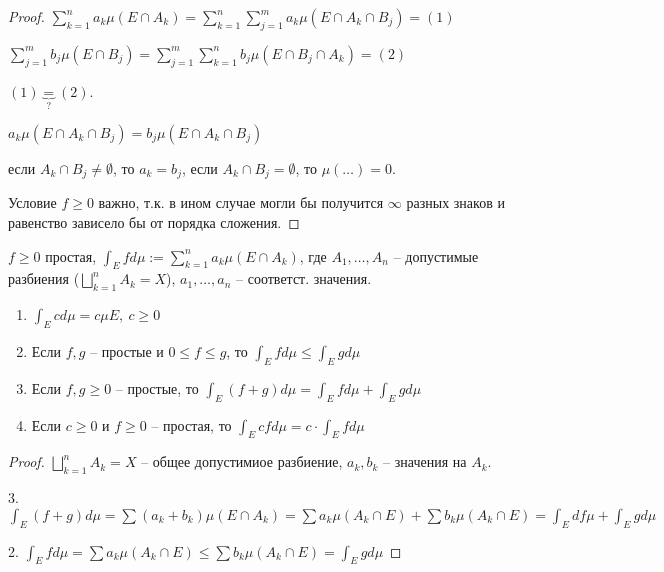 \begin{proof}
    $\sum_{k=1}^{n} a_k \mu (E \cap A_k) = \sum_{k=1}^{n} \sum_{j=1}^{m} a_k \mu (E \cap A_k \cap B_j) = (1)$

    $\sum_{j=1}^{m} b_j \mu (E \cap B_j) = \sum_{j=1}^{m} \sum_{k=1}^{n} b_j \mu (E \cap B_j \cap A_k) = (2)$

    $(1) \underbrace{=}_{?} (2)$.

    $a_k \mu (E \cap A_k \cap B_j) = b_j \mu (E \cap A_k \cap B_j)$

    если $A_k \cap B_j \not = \emptyset$, то $a_k = b_j$, если $A_k \cap B_j = \emptyset$, то $\mu (\dots) = 0$.

    Условие $f \geq 0$ важно, т.к. в ином случае могли бы получится $\infty$ разных знаков и равенство зависело бы от порядка сложения.
\end{proof}

\begin{definition}
    $f \geq 0$ простая, $\int_{E} f d \mu := \sum_{k=1}^{n} a_k \mu (E \cap A_k)$, где $A_1, \dots , A_n$ -- допустимые разбиения ($\bigsqcup_{k=1}^{n} A_k = X$), $a_1, \dots, a_n$ -- соответст. значения.
\end{definition}

\begin{properties}
    \begin{enumerate}
        \item {
            $\int_{E} c d \mu = c \mu E, \ c \geq 0$
        }
        \item {
            Если $f, g$ -- простые и $0 \leq f \leq g$, то $\int_{E} f d \mu \leq \int_E g d \mu$
        }
        \item {
            Если $f, g \geq 0$ -- простые, то $\int_{E} (f+g) d \mu = \int_{E} f d \mu + \int_{E} g d \mu$
        }
        \item {
            Если $c \geq 0$ и $ f \geq 0$ -- простая, то $\int_{E} c f d \mu = c \cdot \int_{E} f d \mu$
        }
    \end{enumerate}
\end{properties}
\begin{proof}

    $\bigsqcup_{k=1}^{n} A_k = X$ -- общее допустимиое разбиение, $a_k, b_k$ -- значения на $A_k$.


    3. $\int_{E} (f + g) d \mu = \sum (a_k + b_k) \mu (E \cap A_k) = \sum a_k \mu (A_k \cap E) + \sum b_k \mu (A_k \cap E) = \int_E d f \mu + \int_E g d \mu$
    
    2. $\int_E f d \mu = \sum a_k \mu (A_k \cap E) \leq \sum b_k \mu (A_k \cap E) = \int_E g d \mu$
\end{proof}

